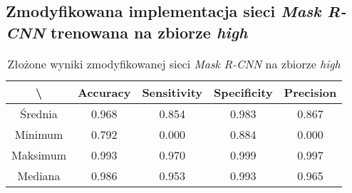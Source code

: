 \subsection{Zmodyfikowana implementacja sieci \textit{Mask R-CNN} trenowana na zbiorze \textit{high}}

\begin{table}[H]
	\centering
	\caption{Złożone wyniki zmodyfikowanej sieci \textit{Mask R-CNN} na zbiorze \textit{high}}
	\vspace{6pt}
	{\footnotesize
		\begin{tabular}{|c|c|c|c|c|}
      \hline \textbackslash & Accuracy & Sensitivity & Specificity & Precision \\
      \hline Średnia & 0.968 & 0.854 & 0.983 & 0.867 \\
      \hline Minimum & 0.792 & 0.000 & 0.884 & 0.000 \\
      \hline Maksimum & 0.993 & 0.970 & 0.999 & 0.997 \\
      \hline Mediana & 0.986 & 0.953 & 0.993 & 0.965 \\
      \hline
		\end{tabular}
	}
  \vspace{0pt}
  \label{Tab:high_modified_calculated}
\end{table}



